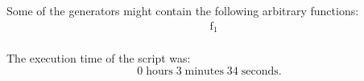 \noindent Some of the generators might contain the following arbitrary functions:
\begin{align*}
&\operatorname{f_{1}}\\
\end{align*}

\noindent The execution time of the script was:
$$0\;\mathrm{hours}\;3\;\mathrm{minutes}\;34 \;\mathrm{seconds}.$$
